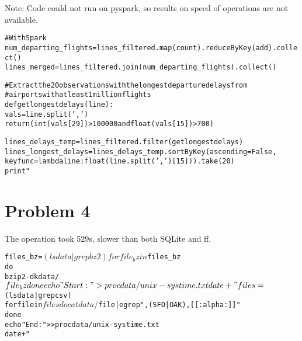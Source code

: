 \documentclass{article}\usepackage[]{graphicx}\usepackage[]{color}
\makeatletter
\newenvironment{kframe}{%
 \def\at@end@of@kframe{}%
 \ifinner\ifhmode%
  \def\at@end@of@kframe{\end{minipage}}%
  \begin{minipage}{\columnwidth}%
 \fi\fi%
 \def\FrameCommand##1{\hskip\@totalleftmargin \hskip-\fboxsep
 \colorbox{shadecolor}{##1}\hskip-\fboxsep
     \hskip-\linewidth \hskip-\@totalleftmargin \hskip\columnwidth}%
 \MakeFramed {\advance\hsize-\width
   \@totalleftmargin\z@ \linewidth\hsize
   \@setminipage}}%
 {\par\unskip\endMakeFramed%
 \at@end@of@kframe}
\newenvironment{knitrout}{}{} %
\makeatother
\begin{document}
Note: Code could not run on pyspark, so results on speed of operations are not available.

\begin{knitrout}
\color{fgcolor}\begin{kframe}
\begin{alltt}
# With Spark
num_departing_flights = lines_filtered.map(count).reduceByKey(add).collect()
lines_merged = lines_filtered.join(num_departing_flights).collect()

# Extract the 20 observations with the longest departure delays from
# airports with at least 1 million flights
def getlongestdelays(line):
  vals = line.split(',')
return(int(vals[29]) > 100000 and float(vals[15]) > 700)

lines_delays_temp = lines_filtered.filter(getlongestdelays)
lines_longest_delays = lines_delays_temp.sortByKey(ascending = False, 
                                                   keyfunc = lambda line: float(line.split(',')[15])).take(20)
print "%f " %  time.time()
\end{alltt}
\end{kframe}
\end{knitrout}
\section{Problem 4}
The operation took 529s, slower than both SQLite and ff.

\begin{knitrout}
\color{fgcolor}\begin{kframe}
\begin{alltt}
files_bz=$(ls data | grep bz2)
for file_bz in $files_bz
do
bzip2 -dk data/$file_bz
done

echo "Start: " > procdata/unix-systime.txt
date +"%s" >> procdata/unix-systime.txt
files=$(ls data | grep csv)
for file in $files
do
cat data/$file | egrep ",(SFO|OAK),[[:alpha:]]"
done
echo "End: " >> procdata/unix-systime.txt
date +"%s" >> procdata/unix-systime.txt
\end{alltt}
\end{kframe}
\end{knitrout}
\end{document}
